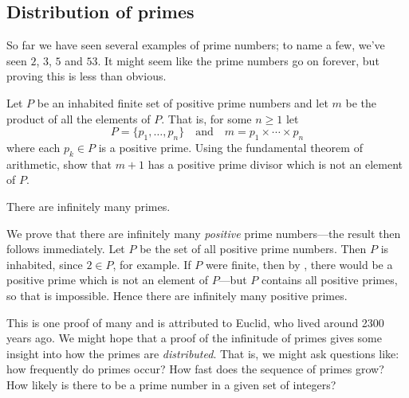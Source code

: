 \subsection*{Distribution of primes}

So far we have seen several examples of prime numbers; to name a few, we've seen $2$, $3$, $5$ and $53$. It might seem like the prime numbers go on forever, but proving this is less than obvious.

\begin{exercise}
\label{exConstructPrimeNotInList}
Let $P$ be an inhabited finite set of positive prime numbers and let $m$ be the product of all the elements of $P$. That is, for some $n \ge 1$ let
\[ P = \{ p_1, \dots, p_n \} \quad \text{and} \quad m = p_1 \times \cdots \times p_n \]
where each $p_k \in P$ is a positive prime. Using the fundamental theorem of arithmetic, show that $m+1$ has a positive prime divisor which is not an element of $P$.
\end{exercise}

\begin{theorem}
There are infinitely many primes.
\end{theorem}
\begin{cproof}
We prove that there are infinitely many \textit{positive} prime numbers---the result then follows immediately. Let $P$ be the set of all positive prime numbers. Then $P$ is inhabited, since $2 \in P$, for example. If $P$ were finite, then by , there would be a positive prime which is not an element of $P$---but $P$ contains all positive primes, so that is impossible. Hence there are infinitely many positive primes.
\end{cproof}

This is one proof of many and is attributed to Euclid, who lived around 2300 years ago. We might hope that a proof of the infinitude of primes gives some insight into how the primes are \textit{distributed}. That is, we might ask questions like: how frequently do primes occur? How fast does the sequence of primes grow? How likely is there to be a prime number in a given set of integers?

